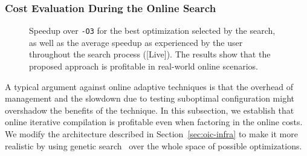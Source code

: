 \subsubsection{Cost Evaluation During the Online Search}

\begin{figure}[t]
  \centering
  \hfill
  \hfill
  \caption{Speedup over \texttt{-O3} for the best optimization selected by the search, as well as the average speedup as experienced by the
    user throughout the search process ([Live]). The results show that the proposed approach is profitable in real-world online scenarios.}
  \label{fig:deployment_cost}
\end{figure}

A typical argument against online adaptive techniques is that the overhead of management and the slowdown due to testing suboptimal
configuration might overshadow the benefits of the technique. In this subsection, we establish that online iterative compilation is
profitable even when factoring in the online costs. We modify the architecture described in Section~\ref{sec:oic-infra} to make it more
realistic by using genetic search~\cite{knijnenburg02,kulkarni04} over the whole space of possible optimizations. 

